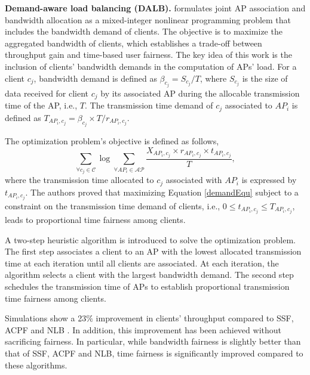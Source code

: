 \textbf{Demand-aware load balancing (DALB).} %
\cite{Demand-aware-LB-Association-15} formulates joint AP association and bandwidth allocation as a mixed-integer nonlinear programming problem that includes the bandwidth demand of clients. 
The objective is to maximize the aggregated bandwidth of clients, which establishes a trade-off between throughput gain and time-based user fairness. 
The key idea of this work is the inclusion of clients' bandwidth demands in the computation of APs' load. 
For a client $c_{j}$, bandwidth demand is defined as $\beta_{c_{j}}=S_{c_{j}}/{T}$, where $S_{c_{j}}$ is the size of data received for client $c_{j}$ by its associated AP during the allocable transmission time of the AP, i.e., $T$. 
The transmission time demand of $c_{j}$ associated to $AP_{i}$ is defined as $T_{AP_{i},c_{j}} = \beta_{c_{j}}\times T/r_{AP_{i},c_{j}}$.

The optimization problem's objective is defined as follows,
\begin{equation}
\label{demandEqu}
\sum_{\forall c_{j} \in \mathcal{C}} \log\sum_{\forall AP_{i} \in \mathcal{AP}} \frac{X_{AP_{i},c_{j}}\times r_{AP_{i},c_{j}} \times t_{AP_{i},c_{j}}}{T},
\end{equation}
where the transmission time allocated to $c_{j}$ associated with $AP_{i}$ is expressed by $t_{AP_{i},c_{j}}$. 
The authors proved that maximizing Equation \ref{demandEqu} subject to a constraint on the transmission time demand of clients, i.e., $0 \le t_{AP_{i},c_{j}} \le T_{AP_{i},c_{j}}$, leads to proportional time fairness among clients.

A two-step heuristic algorithm is introduced to solve the optimization problem. 
The first step associates a client to an AP with the lowest allocated transmission time at each iteration until all clients are associated. 
At each iteration, the algorithm selects a client with the largest bandwidth demand. 
The second step schedules the transmission time of APs to establish proportional transmission time fairness among clients. 

Simulations show a 23$\%$ improvement in clients' throughput compared to SSF, ACPF and NLB \cite{NLB-13}.
In addition, this improvement has been achieved without sacrificing fairness. 
In particular, while bandwidth fairness is slightly better than that of SSF, ACPF and NLB, time fairness is significantly improved compared to these algorithms.





